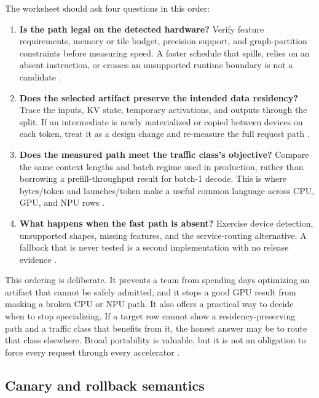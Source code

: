 The worksheet should ask four questions in this order:

\begin{enumerate}
\item \textbf{Is the path legal on the detected hardware?} Verify feature requirements, memory or tile budget, precision support, and graph-partition constraints before measuring speed. A faster schedule that spills, relies on an absent instruction, or crosses an unsupported runtime boundary is not a candidate \citep{nvidia2022hopper,amd2024aie,yirage2026}.
\item \textbf{Does the selected artifact preserve the intended data residency?} Trace the inputs, KV state, temporary activations, and outputs through the split. If an intermediate is newly materialized or copied between devices on each token, treat it as a design change and re-measure the full request path \citep{memoryfloor2026,kwon2023vllm}.
\item \textbf{Does the measured path meet the traffic class's objective?} Compare the same context lengths and batch regime used in production, rather than borrowing a prefill-throughput result for batch-1 decode. This is where bytes/token and launches/token make a useful common language across CPU, GPU, and NPU rows \citep{taxbreak2026,memoryfloor2026}.
\item \textbf{What happens when the fast path is absent?} Exercise device detection, unsupported shapes, missing features, and the service-routing alternative. A fallback that is never tested is a second implementation with no release evidence \citep{iree2024,rotem2018glow}.
\end{enumerate}

This ordering is deliberate. It prevents a team from spending days optimizing an artifact that cannot be safely admitted, and it stops a good GPU result from masking a broken CPU or NPU path. It also offers a practical way to decide when to stop specializing. If a target row cannot show a residency-preserving path and a traffic class that benefits from it, the honest answer may be to route that class elsewhere. Broad portability is valuable, but it is not an obligation to force every request through every accelerator \citep{patel2025llminference,rotem2018glow}.

\subsection{Canary and rollback semantics}


